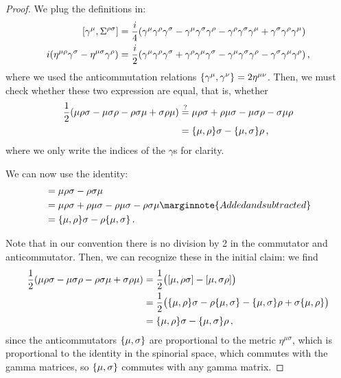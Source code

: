 \documentclass[main.tex]{subfiles}
\begin{document}
\begin{proof}
We plug the definitions in: 
%
\begin{align}
\qty[\gamma^{\mu }, \Sigma^{\rho \sigma }] &= \frac{i}{4} \qty(\gamma^{\mu } \gamma^{\rho} \gamma^{\sigma } - \gamma^{\mu } \gamma^{\sigma } \gamma^{\rho } - \gamma^{ \rho } \gamma^{\sigma } \gamma^{\mu } + \gamma^{ \sigma } \gamma^{ \rho } \gamma^{ \mu })  \\
i \qty(\eta^{\mu \rho } \gamma^{\sigma } - \eta^{\mu \sigma } \gamma^{\rho }) &= \frac{i}{2} \qty(\gamma^{\mu} \gamma^{\rho } \gamma^{\sigma } + \gamma^{\rho } \gamma^{\mu } \gamma^{\sigma } -\gamma^{\mu } \gamma^{\sigma }\gamma^{\rho } - \gamma^{\sigma } \gamma^{\mu } \gamma^{ \rho } )
\,,
\end{align}
%
where we used the anticommutation relations \(\qty{\gamma^{\mu }, \gamma^{\nu }} = 2 \eta^{\mu \nu }\). 
Then, we must check whether these two expression are equal, that is, whether 
%
\begin{align}
\frac{1}{2} \qty( \mu  \rho \sigma  - \mu  \sigma  \rho  -  \rho  \sigma  \mu  +  \sigma   \rho   \mu ) &\overset{?}{=} 
\mu \rho  \sigma  + \rho  \mu  \sigma  -\mu  \sigma \rho  - \sigma  \mu   \rho   \\
&=  \qty{\mu, \rho }\sigma - \qty{\mu , \sigma } \rho 
\,,
\end{align}
%
where we only write the indices of the \(\gamma \)s for clarity. 

We can now use the identity: 
%
\begin{align}
[\mu , \rho \sigma ] &= \mu \rho \sigma - \rho \sigma \mu  \\
&= \mu \rho \sigma + \rho \mu \sigma - \rho \mu \sigma - \rho \sigma \mu \marginnote{Added and subtracted}  \\
&= \qty{\mu, \rho } \sigma - \rho \qty{\mu, \sigma }
\,.
\end{align}

Note that in our convention there is no division by 2 in the commutator and anticommutator. 
Then, we can recognize these in the initial claim: we find 
%
\begin{align}
\frac{1}{2} \qty( \mu  \rho \sigma  - \mu  \sigma  \rho  -  \rho  \sigma  \mu  +  \sigma   \rho   \mu )
&= \frac{1}{2} \qty(\qty[\mu, \rho \sigma ] - \qty[\mu, \sigma \rho ])  \\
&= \frac{1}{2} \qty(\qty{\mu, \rho } \sigma - \rho \qty{\mu, \sigma } -
\qty{\mu, \sigma } \rho + \sigma \qty{\mu, \rho })  \\
&= \qty{\mu, \rho } \sigma - \qty{\mu, \sigma } \rho 
\,,
\end{align}
%
since the anticommutators \(\qty{\mu, \sigma }\) are proportional to the metric \(\eta^{\mu \sigma }\), which is proportional to the identity in the spinorial space, which commutes with the gamma matrices, so \(\qty{\mu , \sigma }\) commutes with any gamma matrix. 
\end{proof}
\end{document}
